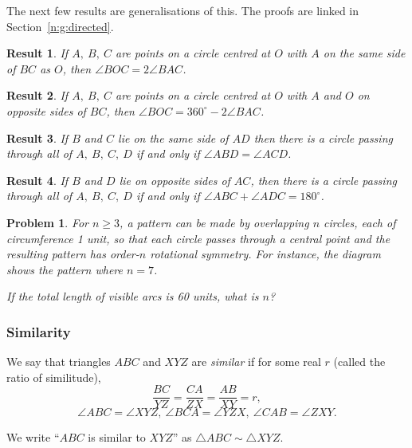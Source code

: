 \documentclass{amsart}
\newtheorem{problem}{Problem}[subsubsection]
\newtheorem{result}{Result}[subsubsection]
\begin{document}
The next few results are generalisations of this. The proofs are linked in
Section~\ref{n:g:directed}.
\begin{result}{\label{r:b:g:ci:2}}
  If $A,\ B,\ C$ are points on a circle centred at $O$ with $A$ on the same side
  of $BC$ as $O$, then $\angle BOC=2\angle BAC$.
\end{result}
\begin{result}{\label{r:b:g:ci:3}}
  If $A,\ B,\ C$ are points on a circle centred at $O$ with $A$ and $O$ on
  opposite sides of $BC$, then $\angle BOC=360^\circ-2\angle BAC$.
\end{result}
\begin{result}{\label{r:b:g:ci:4}}
  If $B$ and $C$ lie on the same side of $AD$ then there is a circle passing
  through all of $A,\ B,\ C,\ D$ if and only if $\angle ABD=\angle ACD$.
\end{result}
\begin{result}{\label{r:b:g:ci:5}}
  If $B$ and $D$ lie on opposite sides of $AC$, then there is a circle passing
  through all of $A,\ B,\ C,\ D$ if and only if $\angle ABC+\angle
  ADC=180^\circ$.
\end{result}
\begin{problem}{\label{p:b:g:ci:1}}
  For $n\ge 3$, a pattern can be made by overlapping $n$ circles, each of
  circumference 1 unit, so that each circle passes through a central point and
  the resulting pattern has order-$n$ rotational symmetry. For instance, the
  diagram shows the pattern where $n=7$.

  If the total length of visible arcs is 60 units, what is $n$?
\end{problem}
\subsubsection{Similarity}
  We say that triangles $ABC$ and $XYZ$ are \emph{similar} if for some real $r$
  (called the ratio of similitude),
      \[\frac{BC}{YZ}=\frac{CA}{ZX}=\frac{AB}{XY}=r,\]
      \[\angle ABC=\angle XYZ,\
      \angle BCA=\angle YZX,\ \angle CAB=\angle ZXY.\]

    We write ``$ABC$ is similar to $XYZ$'' as $\triangle ABC\sim\triangle XYZ$.
\end{document}
